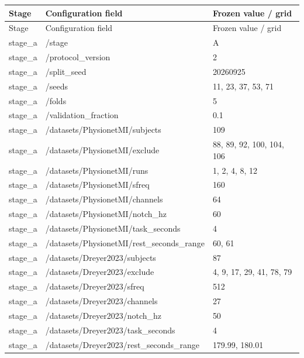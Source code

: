 \begin{longtable}{p{.65in}p{2.8in}p{3.2in}}
\toprule
Stage & Configuration field & Frozen value / grid \\
\midrule
\endfirsthead
\toprule
Stage & Configuration field & Frozen value / grid \\
\midrule
\endhead
stage\_\allowbreak{}a & /stage & A \\
stage\_\allowbreak{}a & /protocol\_\allowbreak{}version & 2 \\
stage\_\allowbreak{}a & /split\_\allowbreak{}seed & 20260925 \\
stage\_\allowbreak{}a & /seeds & 11, 23, 37, 53, 71 \\
stage\_\allowbreak{}a & /folds & 5 \\
stage\_\allowbreak{}a & /validation\_\allowbreak{}fraction & 0.1 \\
stage\_\allowbreak{}a & /datasets/PhysionetMI/subjects & 109 \\
stage\_\allowbreak{}a & /datasets/PhysionetMI/exclude & 88, 89, 92, 100, 104, 106 \\
stage\_\allowbreak{}a & /datasets/PhysionetMI/runs & 1, 2, 4, 8, 12 \\
stage\_\allowbreak{}a & /datasets/PhysionetMI/sfreq & 160 \\
stage\_\allowbreak{}a & /datasets/PhysionetMI/channels & 64 \\
stage\_\allowbreak{}a & /datasets/PhysionetMI/notch\_\allowbreak{}hz & 60 \\
stage\_\allowbreak{}a & /datasets/PhysionetMI/task\_\allowbreak{}seconds & 4 \\
stage\_\allowbreak{}a & /datasets/PhysionetMI/rest\_\allowbreak{}seconds\_\allowbreak{}range & 60, 61 \\
stage\_\allowbreak{}a & /datasets/Dreyer2023/subjects & 87 \\
stage\_\allowbreak{}a & /datasets/Dreyer2023/exclude & 4, 9, 17, 29, 41, 78, 79 \\
stage\_\allowbreak{}a & /datasets/Dreyer2023/sfreq & 512 \\
stage\_\allowbreak{}a & /datasets/Dreyer2023/channels & 27 \\
stage\_\allowbreak{}a & /datasets/Dreyer2023/notch\_\allowbreak{}hz & 50 \\
stage\_\allowbreak{}a & /datasets/Dreyer2023/task\_\allowbreak{}seconds & 4 \\
stage\_\allowbreak{}a & /datasets/Dreyer2023/rest\_\allowbreak{}seconds\_\allowbreak{}range & 179.99, 180.01 \\

\end{longtable}
